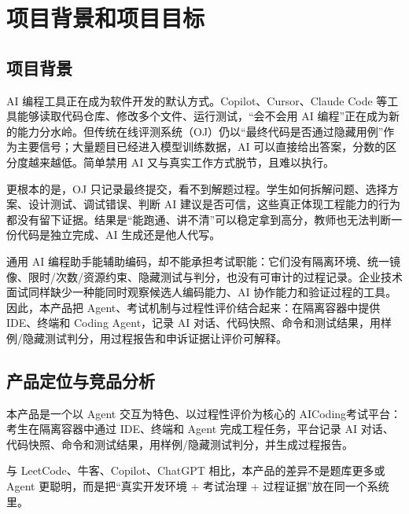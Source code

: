 \documentclass[UTF8,12pt,a4paper]{ctexart}
\begin{document}
\newpage
\tableofcontents
\newpage

\section{项目背景和项目目标}

\subsection{项目背景}

AI 编程工具正在成为软件开发的默认方式。Copilot、Cursor、Claude Code 等工具能够读取代码仓库、修改多个文件、运行测试，“会不会用 AI 编程”正在成为新的能力分水岭。但传统在线评测系统（OJ）仍以“最终代码是否通过隐藏用例”作为主要信号；大量题目已经进入模型训练数据，AI 可以直接给出答案，分数的区分度越来越低。简单禁用 AI 又与真实工作方式脱节，且难以执行。

更根本的是，OJ 只记录最终提交，看不到解题过程。学生如何拆解问题、选择方案、设计测试、调试错误、判断 AI 建议是否可信，这些真正体现工程能力的行为都没有留下证据。结果是“能跑通、讲不清”可以稳定拿到高分，教师也无法判断一份代码是独立完成、AI 生成还是他人代写。

通用 AI 编程助手能辅助编码，却不能承担考试职能：它们没有隔离环境、统一镜像、限时/次数/资源约束、隐藏测试与判分，也没有可审计的过程记录。企业技术面试同样缺少一种能同时观察候选人编码能力、AI 协作能力和验证过程的工具。因此，本产品把 Agent、考试机制与过程性评价结合起来：在隔离容器中提供 IDE、终端和 Coding Agent，记录 AI 对话、代码快照、命令和测试结果，用样例/隐藏测试判分，用过程报告和申诉证据让评价可解释。

\subsection{产品定位与竞品分析}

本产品是一个以 Agent 交互为特色、以过程性评价为核心的 AICoding考试平台：考生在隔离容器中通过 IDE、终端和 Agent 完成工程任务，平台记录 AI 对话、代码快照、命令和测试结果，用样例/隐藏测试判分，并生成过程报告。

与 LeetCode、牛客、Copilot、ChatGPT 相比，本产品的差异不是题库更多或 Agent 更聪明，而是把“真实开发环境 + 考试治理 + 过程证据”放在同一个系统里。
\end{document}
